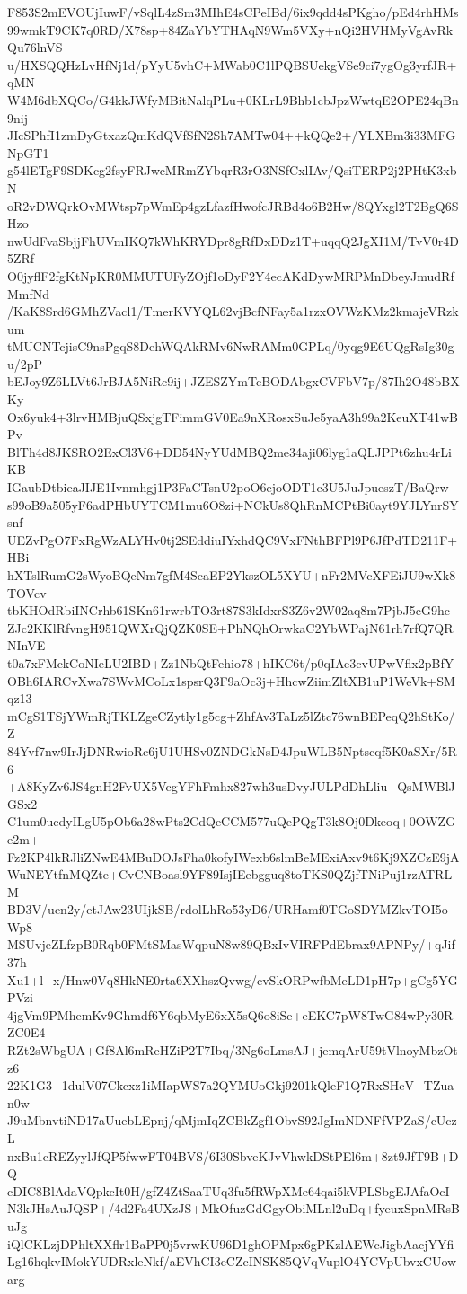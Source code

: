 F853S2mEVOUjIuwF/vSqlL4zSm3MIhE4sCPeIBd/6ix9qdd4sPKgho/pEd4rhHMs
99wmkT9CK7q0RD/X78sp+84ZaYbYTHAqN9Wm5VXy+nQi2HVHMyVgAvRkQu76lnVS
u/HXSQQHzLvHfNj1d/pYyU5vhC+MWab0C1lPQBSUekgVSe9ci7ygOg3yrfJR+qMN
W4M6dbXQCo/G4kkJWfyMBitNalqPLu+0KLrL9Bhb1cbJpzWwtqE2OPE24qBn9nij
JIcSPhfI1zmDyGtxazQmKdQVfSfN2Sh7AMTw04++kQQe2+/YLXBm3i33MFGNpGT1
g54lETgF9SDKcg2fsyFRJwcMRmZYbqrR3rO3NSfCxlIAv/QsiTERP2j2PHtK3xbN
oR2vDWQrkOvMWtsp7pWmEp4gzLfazfHwofcJRBd4o6B2Hw/8QYxgl2T2BgQ6SHzo
nwUdFvaSbjjFhUVmIKQ7kWhKRYDpr8gRfDxDDz1T+uqqQ2JgXI1M/TvV0r4D5ZRf
O0jyflF2fgKtNpKR0MMUTUFyZOjf1oDyF2Y4ecAKdDywMRPMnDbeyJmudRfMmfNd
/KaK8Srd6GMhZVacl1/TmerKVYQL62vjBcfNFay5a1rzxOVWzKMz2kmajeVRzkum
tMUCNTcjisC9nsPgqS8DehWQAkRMv6NwRAMm0GPLq/0yqg9E6UQgRsIg30gu/2pP
bEJoy9Z6LLVt6JrBJA5NiRc9ij+JZESZYmTcBODAbgxCVFbV7p/87Ih2O48bBXKy
Ox6yuk4+3lrvHMBjuQSxjgTFimmGV0Ea9nXRosxSuJe5yaA3h99a2KeuXT41wBPv
BlTh4d8JKSRO2ExCl3V6+DD54NyYUdMBQ2me34aji06lyg1aQLJPPt6zhu4rLiKB
IGaubDtbieaJIJE1Ivnmhgj1P3FaCTsnU2poO6ejoODT1c3U5JuJpueszT/BaQrw
s99oB9a505yF6adPHbUYTCM1mu6O8zi+NCkUs8QhRnMCPtBi0ayt9YJLYnrSYsnf
UEZvPgO7FxRgWzALYHv0tj2SEddiuIYxhdQC9VxFNthBFPl9P6JfPdTD211F+HBi
hXTslRumG2sWyoBQeNm7gfM4ScaEP2YkszOL5XYU+nFr2MVcXFEiJU9wXk8TOVcv
tbKHOdRbiINCrhb61SKn61rwrbTO3rt87S3kIdxrS3Z6v2W02aq8m7PjbJ5cG9hc
ZJc2KKlRfvngH951QWXrQjQZK0SE+PhNQhOrwkaC2YbWPajN61rh7rfQ7QRNInVE
t0a7xFMckCoNIeLU2IBD+Zz1NbQtFehio78+hIKC6t/p0qIAe3cvUPwVflx2pBfY
OBh6IARCvXwa7SWvMCoLx1spsrQ3F9aOc3j+HhcwZiimZltXB1uP1WeVk+SMqz13
mCgS1TSjYWmRjTKLZgeCZytly1g5cg+ZhfAv3TaLz5lZtc76wnBEPeqQ2hStKo/Z
84Yvf7nw9IrJjDNRwioRc6jU1UHSv0ZNDGkNsD4JpuWLB5Nptscqf5K0aSXr/5R6
+A8KyZv6JS4gnH2FvUX5VcgYFhFmhx827wh3usDvyJULPdDhLliu+QsMWBlJGSx2
C1um0ucdyILgU5pOb6a28wPts2CdQeCCM577uQePQgT3k8Oj0Dkeoq+0OWZGe2m+
Fz2KP4lkRJliZNwE4MBuDOJsFha0kofyIWexb6slmBeMExiAxv9t6Kj9XZCzE9jA
WuNEYtfnMQZte+CvCNBoasl9YF89IsjIEebgguq8toTKS0QZjfTNiPuj1rzATRLM
BD3V/uen2y/etJAw23UIjkSB/rdolLhRo53yD6/URHamf0TGoSDYMZkvTOI5oWp8
MSUvjeZLfzpB0Rqb0FMtSMasWqpuN8w89QBxIvVIRFPdEbrax9APNPy/+qJif37h
Xu1+l+x/Hnw0Vq8HkNE0rta6XXhszQvwg/cvSkORPwfbMeLD1pH7p+gCg5YGPVzi
4jgVm9PMhemKv9Ghmdf6Y6qbMyE6xX5sQ6o8iSe+eEKC7pW8TwG84wPy30RZC0E4
RZt2sWbgUA+Gf8Al6mReHZiP2T7Ibq/3Ng6oLmsAJ+jemqArU59tVlnoyMbzOtz6
22K1G3+1dulV07Ckcxz1iMIapWS7a2QYMUoGkj9201kQleF1Q7RxSHcV+TZuan0w
J9uMbnvtiND17aUuebLEpnj/qMjmIqZCBkZgf1ObvS92JgImNDNFfVPZaS/cUczL
nxBu1cREZyylJfQP5fwwFT04BVS/6I30SbveKJvVhwkDStPEl6m+8zt9JfT9B+DQ
cDIC8BlAdaVQpkcIt0H/gfZ4ZtSaaTUq3fu5fRWpXMe64qai5kVPLSbgEJAfaOcI
N3kJHsAuJQSP+/4d2Fa4UXzJS+MkOfuzGdGgyObiMLnl2uDq+fyeuxSpnMRsBuJg
iQlCKLzjDPhltXXflr1BaPP0j5vrwKU96D1ghOPMpx6gPKzlAEWcJigbAacjYYfi
Lg16hqkvIMokYUDRxleNkf/aEVhCI3eCZcINSK85QVqVuplO4YCVpUbvxCUowarg
